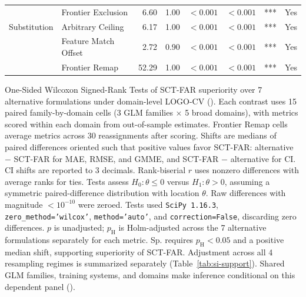 \documentclass{article}
\begin{document}
\begin{table}[H]
\begin{tabularx}{\linewidth}{@{}l>{\raggedright\arraybackslash}Xrrrrrr@{}}
 & Frontier Exclusion & 6.60 & 1.00 & $<0.001$ & $<0.001$ & *** & Yes \\
\addlinespace
Substitution & Arbitrary Ceiling & 6.17 & 1.00 & $<0.001$ & $<0.001$ & *** & Yes \\
 & Feature Match Offset & 2.72 & 0.90 & $<0.001$ & $<0.001$ & *** & Yes \\
 & Frontier Remap & 52.29 & 1.00 & $<0.001$ & $<0.001$ & *** & Yes \\
\bottomrule
\end{tabularx}
\par\vspace{12pt}
\begin{minipage}{\linewidth}
\footnotesize
One-Sided Wilcoxon Signed-Rank Tests of SCT-FAR superiority over 7 alternative formulations under domain-level LOGO-CV (). Each contrast uses 15 paired family-by-domain cells (3 GLM families $\times$ 5 broad domains), with metrics scored within each domain from out-of-sample estimates. Frontier Remap cells average metrics across 30 reassignments after scoring. Shifts are medians of paired differences oriented such that positive values favor SCT-FAR: alternative $-$ SCT-FAR for MAE, RMSE, and GMME, and SCT-FAR $-$ alternative for CI. CI shifts are reported to 3 decimals. Rank-biserial $r$ uses nonzero differences with average ranks for ties. Tests assess $H_0:\theta\leq0$ versus $H_1:\theta>0$, assuming a symmetric paired-difference distribution with location $\theta$. Raw differences with magnitude $<10^{-10}$ were zeroed. Tests used \texttt{SciPy 1.16.3}, \texttt{zero\_method='wilcox'}, \texttt{method='auto'}, and \texttt{correction=False}, discarding zero differences. $p$ is unadjusted; $p_{\mathrm H}$ is Holm-adjusted across the 7 alternative formulations separately for each metric. Sp. requires $p_{\mathrm H}<0.05$ and a positive median shift, supporting superiority of SCT-FAR. Adjustment across all 4 resampling regimes is summarized separately (Table~\ref{tab:si-support}). Shared GLM families, training systems, and domains make inference conditional on this dependent panel ().
\end{minipage}
\end{table}
\end{document}
